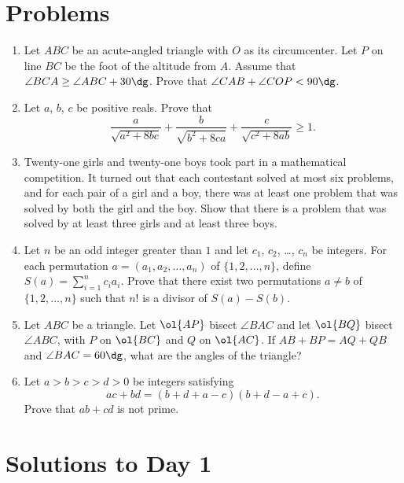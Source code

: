 \documentclass[11pt]{scrartcl}
\begin{document}
\section{Problems}
\begin{enumerate}[\bfseries 1.]
\item %
Let $ABC$ be an acute-angled triangle with $O$ as its circumcenter.
Let $P$ on line $BC$ be the foot of the altitude from $A$.
Assume that $\angle BCA \ge \angle ABC + 30\dg$.
Prove that $\angle CAB + \angle COP < 90\dg$.

\item %
Let $a$, $b$, $c$ be positive reals. Prove that
\[ \frac{a}{\sqrt{a^2+8bc}} + \frac{b}{\sqrt{b^2+8ca}} + \frac{c}{\sqrt{c^2+8ab}} \ge 1. \]

\item %
Twenty-one girls and twenty-one boys
took part in a mathematical competition.
It turned out that each contestant solved at most six problems,
and for each pair of a girl and a boy,
there was at least one problem that was
solved by both the girl and the boy.
Show that there is a problem that was solved by
at least three girls and at least three boys.

\item %
Let $n$ be an odd integer greater than $1$
and let $c_1$, $c_2$, \dots, $c_n$ be integers.
For each permutation $a = (a_1, a_2, \dots, a_n)$
of $\{1,2,\dots,n\}$, define $S(a) = \sum_{i=1}^n c_i a_i$.
Prove that there exist two permutations $a \neq b$
of $\{1,2,\dots,n\}$ such that $n!$
is a divisor of $S(a)-S(b)$.

\item %
Let $ABC$ be a triangle.
Let $\ol{AP}$ bisect $\angle BAC$ and let $\ol{BQ}$ bisect $\angle ABC$,
with $P$ on $\ol{BC}$ and $Q$ on $\ol{AC}$.
If $AB + BP = AQ + QB$ and $\angle BAC = 60\dg$,
what are the angles of the triangle?

\item %
Let $a > b > c > d > 0$ be integers satisfying
\[ ac + bd = (b+d+a-c)(b+d-a+c).  \]
Prove that $ab + cd$ is not prime.

\end{enumerate}
\pagebreak

\section{Solutions to Day 1}
\end{document}
